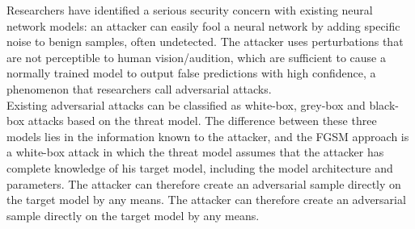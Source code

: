 

Researchers have identified a serious security concern with existing neural network models: an attacker can easily fool a neural network by adding specific noise to benign samples, often undetected. The attacker uses perturbations that are not perceptible to human vision/audition, which are sufficient to cause a normally trained model to output false predictions with high confidence, a phenomenon that researchers call adversarial attacks.
\\

Existing adversarial attacks can be classified as white-box, grey-box and black-box attacks based on the threat model. The difference between these three models lies in the information known to the attacker, and the FGSM approach is a white-box attack in which the threat model assumes that the attacker has complete knowledge of his target model, including the model architecture and parameters. The attacker can therefore create an adversarial sample directly on the target model by any means. The attacker can therefore create an adversarial sample directly on the target model by any means.

